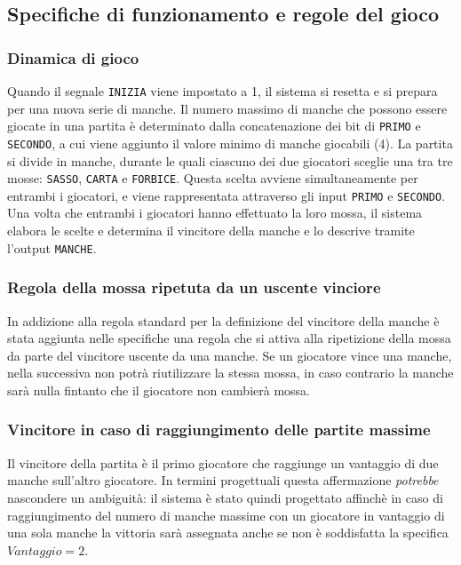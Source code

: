 \documentclass[a4paper]{report}
\begin{document}
\subsection{Specifiche di funzionamento e regole del gioco}
\subsubsection*{Dinamica di gioco}

Quando il segnale \texttt{INIZIA} viene impostato a 1, il sistema si resetta e si prepara per una nuova serie di manche.
Il numero massimo di manche che possono essere giocate in una partita è determinato dalla concatenazione dei bit di \texttt{PRIMO} e \texttt{SECONDO}, a cui viene aggiunto il valore minimo di manche giocabili (4).
La partita si divide in manche, durante le quali ciascuno dei due giocatori sceglie una tra tre mosse: \texttt{SASSO}, \texttt{CARTA} e \texttt{FORBICE}.
Questa scelta avviene simultaneamente per entrambi i giocatori, e viene rappresentata attraverso gli input \texttt{PRIMO} e \texttt{SECONDO}.
Una volta che entrambi i giocatori hanno effettuato la loro mossa, il sistema elabora le scelte e determina il vincitore della manche e lo descrive tramite l'output \texttt{MANCHE}.\@
\\

\subsubsection*{Regola della mossa ripetuta da un uscente vinciore}
In addizione alla regola standard per la definizione del vincitore della manche è stata aggiunta nelle specifiche una regola che si attiva alla ripetizione della mossa da parte del vincitore uscente da una manche.
Se un giocatore vince una manche, nella successiva non potrà riutilizzare la stessa mossa, in caso contrario la manche sarà nulla fintanto che il giocatore non cambierà mossa.

\subsubsection*{Vincitore in caso di raggiungimento delle partite massime}
Il vincitore della partita è il primo giocatore che raggiunge un vantaggio di due manche sull'altro giocatore.
In termini progettuali questa affermazione \textit{potrebbe} nascondere un ambiguità: il sistema è stato quindi progettato affinchè in caso di raggiungimento del numero di manche massime con un giocatore in vantaggio di una sola manche la vittoria sarà assegnata anche se non è soddisfatta la specifica $ Vantaggio = 2 $.
\end{document}
